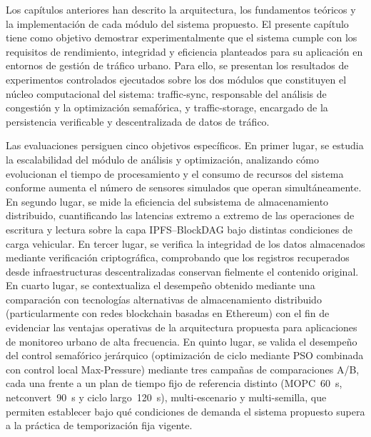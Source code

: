 
Los capítulos anteriores han descrito la arquitectura, los fundamentos teóricos y la
implementación de cada módulo del sistema propuesto. El presente capítulo tiene como objetivo
demostrar experimentalmente que el sistema cumple con los requisitos de rendimiento, integridad y
eficiencia planteados para su aplicación en entornos de gestión de tráfico urbano. Para ello,
se presentan los resultados de experimentos controlados ejecutados sobre los dos módulos que
constituyen el núcleo computacional del sistema: traffic-sync, responsable del análisis
de congestión y la optimización semafórica, y traffic-storage, encargado de la
persistencia verificable y descentralizada de datos de tráfico.

Las evaluaciones persiguen cinco objetivos específicos. En primer lugar, se estudia la
escalabilidad del módulo de análisis y optimización, analizando cómo evolucionan el
tiempo de procesamiento y el consumo de recursos del sistema conforme aumenta el número de
sensores simulados que operan simultáneamente. En segundo lugar, se mide la eficiencia
del subsistema de almacenamiento distribuido, cuantificando las latencias extremo a extremo de
las operaciones de escritura y lectura sobre la capa IPFS--BlockDAG bajo distintas condiciones
de carga vehicular. En tercer lugar, se verifica la integridad de los datos almacenados
mediante verificación criptográfica, comprobando que los registros recuperados desde
infraestructuras descentralizadas conservan fielmente el contenido original. En cuarto lugar,
se contextualiza el desempeño obtenido mediante una comparación con tecnologías
alternativas de almacenamiento distribuido (particularmente con redes blockchain basadas en
Ethereum) con el fin de evidenciar las ventajas operativas de la arquitectura propuesta para
aplicaciones de monitoreo urbano de alta frecuencia. En quinto lugar, se valida el
desempeño del control semafórico jerárquico (optimización de ciclo mediante PSO combinada
con control local Max-Pressure) mediante tres campañas de comparaciones A/B, cada una frente
a un plan de tiempo fijo de referencia distinto (MOPC~60~s, netconvert~90~s y ciclo
largo~120~s), multi-escenario y multi-semilla, que permiten establecer bajo qué condiciones
de demanda el sistema propuesto supera a la práctica de temporización fija vigente.

